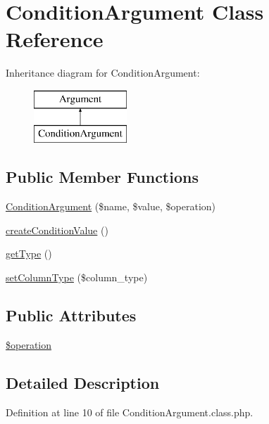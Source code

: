 \hypertarget{classConditionArgument}{\section{Condition\+Argument Class Reference}
\label{classConditionArgument}
}
Inheritance diagram for Condition\+Argument\+:\begin{figure}[H]
\begin{center}
\leavevmode
\includegraphics[height=2.000000cm]{classConditionArgument}
\end{center}
\end{figure}
\subsection*{Public Member Functions}
\begin{DoxyCompactItemize}
\item 
\hyperlink{classConditionArgument_a9adc8c95c5f227954e7b6c46e89a5b65}{Condition\+Argument} (\$name, \$value, \$operation)
\item 
\hyperlink{classConditionArgument_a2f1c182c8765ebc62d2d50f575954982}{create\+Condition\+Value} ()
\item 
\hyperlink{classConditionArgument_a39922137cc67e751a5577850bce3cac7}{get\+Type} ()
\item 
\hyperlink{classConditionArgument_a7ee8444a1bfa4763458a006e0fd6ef1e}{set\+Column\+Type} (\$column\+\_\+type)
\end{DoxyCompactItemize}
\subsection*{Public Attributes}
\begin{DoxyCompactItemize}
\item 
\hyperlink{classConditionArgument_acfccaada47560781bfbdf51086ce3869}{\$operation}
\end{DoxyCompactItemize}


\subsection{Detailed Description}


Definition at line 10 of file Condition\+Argument.\+class.\+php.



